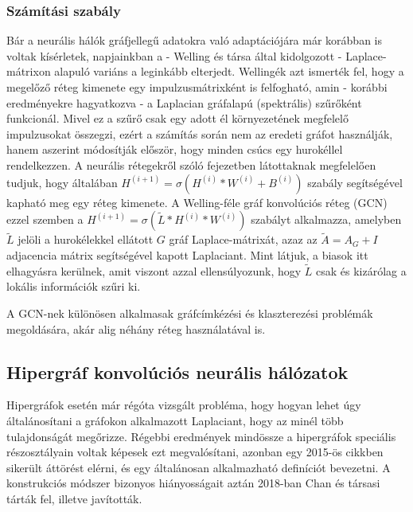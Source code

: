 \subsubsection{Számítási szabály} \label{GCNN}
Bár a neurális hálók gráfjellegű adatokra való adaptációjára már korábban is voltak kísérletek\cite{old_gcnn, old_gcnn2}, napjainkban a - Welling és társa által kidolgozott - Laplace-mátrixon alapuló variáns\cite{base_gcnn} a leginkább elterjedt. Wellingék azt ismerték fel, hogy a megelőző réteg kimenete egy impulzusmátrixként is felfogható, amin - korábbi eredményekre hagyatkozva\cite{laplace_filter} - a Laplacian gráfalapú (spektrális) szűrőként funkcionál. Mivel ez a szűrő csak egy adott él környezetének megfelelő impulzusokat összegzi, ezért a számítás során nem az eredeti gráfot használják, hanem aszerint módosítják először, hogy minden csúcs egy hurokéllel rendelkezzen. A neurális rétegekről szóló fejezetben látottaknak megfelelően tudjuk, hogy általában $H^{(i+1)} = \sigma(H^{(i)} * W^{(i)} + B^{(i)})$ szabály segítségével kapható meg egy réteg kimenete. A Welling-féle gráf konvolúciós réteg (GCN) ezzel szemben a $H^{(i+1)} = \sigma(\tilde L * H^{(i)} * W^{(i)})$ szabályt alkalmazza, amelyben $\tilde L$ jelöli a hurokélekkel ellátott $G$ gráf Laplace-mátrixát, azaz az $\tilde A = A_G + I$ adjacencia mátrix segítségével kapott Laplaciant. Mint látjuk, a biasok itt elhagyásra kerülnek, amit viszont azzal ellensúlyozunk, hogy $\tilde L$ csak és kizárólag a lokális információk szűri ki.


A GCN-nek különösen alkalmasak gráfcímkézési és klaszterezési problémák megoldására, akár alig néhány réteg használatával is.

\subsection{Hipergráf konvolúciós neurális hálózatok} 
Hipergráfok esetén már régóta vizsgált probléma, hogy hogyan lehet úgy általánosítani a gráfokon alkalmazott Laplaciant, hogy az minél több tulajdonságát megőrizze. Régebbi eredmények mindössze a hipergráfok speciális részosztályain voltak képesek ezt megvalósítani\cite{old_spectral_hypergraph, spectra}, azonban egy 2015-ös cikkben\cite{base_hypergraph_laplacian} sikerült áttörést elérni, és egy általánosan alkalmazható definíciót bevezetni. A konstrukciós módszer bizonyos hiányosságait aztán 2018-ban Chan és társasi tárták fel, illetve javították\cite{base_hypergraph_laplacian_refinement}.


